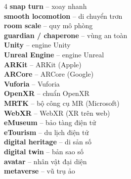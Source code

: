 \begin{multicols}{4}
\textbf{snap turn} -- xoay nhanh\\
\textbf{smooth locomotion} -- di chuyển trơn\\
\textbf{room scale} -- quy mô phòng\\
\textbf{guardian / chaperone} -- vùng an toàn\\
\textbf{Unity} -- engine Unity\\
\textbf{Unreal Engine} -- engine Unreal\\
\textbf{ARKit} -- ARKit (Apple)\\
\textbf{ARCore} -- ARCore (Google)\\
\textbf{Vuforia} -- Vuforia\\
\textbf{OpenXR} -- chuẩn OpenXR\\
\textbf{MRTK} -- bộ công cụ MR (Microsoft)\\
\textbf{WebXR} -- WebXR (XR trên web)\\
\textbf{eMuseum} -- bảo tàng điện tử\\
\textbf{eTourism} -- du lịch điện tử\\
\textbf{digital heritage} -- di sản số\\
\textbf{digital twin} -- bản sao số\\
\textbf{avatar} -- nhân vật đại diện\\
\textbf{metaverse} -- vũ trụ ảo\\


\end{multicols}
